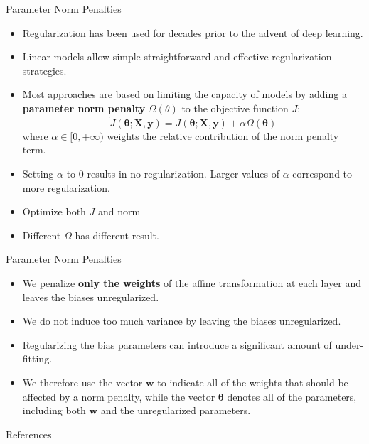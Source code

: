 \documentclass[10pt]{beamer}
\begin{document}
	\begin{frame}{Parameter Norm Penalties}
		\begin{itemize}
			\item Regularization has been used for decades prior to the advent of deep learning.
			\pause
			\item Linear models allow simple straightforward and effective regularization strategies.
			\pause
			\item Most approaches are based on limiting the capacity of models by adding a \textbf{parameter norm penalty} $\Omega(\theta)$ to the objective function $J$:
			$$\tilde{\mathit{J}}(\bm{\theta};\bm{X},\bm{y})=\mathit{J}(\bm{\theta};\bm{X},\bm{y})+\alpha\Omega(\bm{\theta})$$
			where $\alpha\in[0,+\infty)$ weights the relative contribution of the norm penalty term.
			\pause
			\item Setting $\alpha$ to 0 results in no regularization. Larger values of $\alpha$ correspond to more regularization.
			\pause
			\item Optimize both $J$ and norm
			\pause
			\item Different $\Omega$ has different result.
		\end{itemize}
	\end{frame}
	
	\begin{frame}{Parameter Norm Penalties}
		\begin{itemize}
			\item We penalize \textbf{only the weights} of the affine transformation at each layer and leaves the biases unregularized.
			\pause
			\item We do not induce too much variance by leaving the biases unregularized.
			\pause
			\item Regularizing the bias parameters can introduce a significant amount of under-fitting.
			\pause
			\item We therefore use the vector $\bm{w}$ to indicate all of the weights that should be affected by a norm penalty, while the vector $\bm{\theta}$ denotes all of the parameters, including both $\bm{w}$ and the unregularized parameters.
		\end{itemize}
	\end{frame}
	
	
	\begin{frame}[allowframebreaks]{References}
		
		
	\end{frame}
\end{document}
